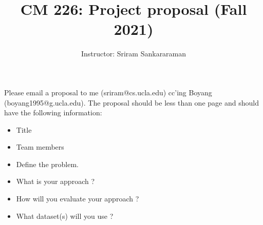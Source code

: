 \documentclass{article}
\title {CM 226: Project proposal (Fall 2021)}
\author{Instructor: Sriram Sankararaman}
\date{}
\begin{document}
\maketitle
Please email a proposal to me (sriram@cs.ucla.edu) cc'ing Boyang (boyang1995@g.ucla.edu). The proposal should be less than one page and should have the following information:
\begin{itemize}
    \item Title
    \item Team members
    \item Define the problem.
    \item What is your approach  ?    
    \item How will you evaluate your approach ? 
    \item What dataset(s) will you use ?     
\end{itemize}
\end{document}
